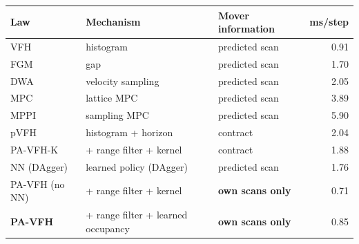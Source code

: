 \footnotesize
\setlength{\tabcolsep}{3pt}
\begin{tabular}{lllr}
\toprule
Law & Mechanism & Mover information & ms/step \\
\midrule
VFH & histogram & predicted scan & 0.91 \\
FGM & gap & predicted scan & 1.70 \\
DWA & velocity sampling & predicted scan & 2.05 \\
MPC & lattice MPC & predicted scan & 3.89 \\
MPPI & sampling MPC & predicted scan & 5.90 \\
pVFH & histogram + horizon & contract & 2.04 \\
PA-VFH-K & + range filter + kernel & contract & 1.88 \\
NN (DAgger) & learned policy (DAgger) & predicted scan & 1.76 \\
PA-VFH (no NN) & + range filter + kernel & \textbf{own scans only} & 0.71 \\
\textbf{PA-VFH} & + range filter + learned occupancy & \textbf{own scans only} & 0.85 \\
\bottomrule
\end{tabular}
